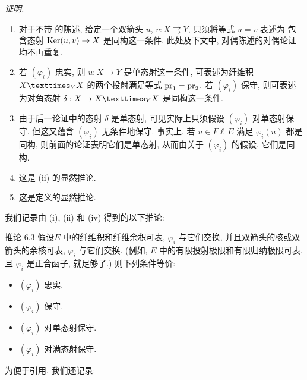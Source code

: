\noindent \emph{证明.}
\begin{enumerate}
\renewcommand{\theenumi}{\roman{enumi}}
\renewcommand{\labelenumi}{(\theenumi)}
\item 对于不带 \resp 的陈述, 给定一个双箭头
$u$, $v:X\rightrightarrows Y$, 只须将等式 $u=v$ 表述为
包含态射 $\operatorname{Ker}(u,v)\rightarrow X$ 是同构这一条件.
此处及下文中, 对偶陈述的对偶论证均不再重复.

\item 若 $(\varphi_i)$ 忠实, 则 $u:X\rightarrow Y$ 是单态射这一条件,
可表述为纤维积 $\fprod{X}{X}{Y}$ 的两个投射满足等式 $\operatorname{pr}_1=\operatorname{pr}_2$.
若 $(\varphi_i)$ 保守, 则可表述为对角态射
$\delta:X\rightarrow \fprod{X}{X}{Y}$ 是同构这一条件.

\setcounter{enumi}{3}
\item 由于后一论证中的态射 $\delta$ 是单态射,
可见实际上只须假设 $(\varphi_i)$ 对单态射保守.
但这又蕴含 $(\varphi_i)$ 无条件地保守.
事实上, 若 $u\in F\ell\,E$ 满足 $\varphi_i(u)$ 都是同构,
则前面的论证表明它们是单态射, 从而由关于 $(\varphi_i)$ 的假设,
它们是同构.

\setcounter{enumi}{2}
\item 这是 (ii) 的显然推论.

\setcounter{enumi}{4}
\item 这是定义的显然推论.
\end{enumerate}

我们记录由 (i), (ii) 和 (iv) 得到的以下推论:

\begin{enonce*}{推论 6.3}
假设\pageoriginale $E$ 中的纤维积和纤维余积可表,
$\varphi_i$ 与它们交换, 并且双箭头的核或双箭头的余核可表,
$\varphi_i$ 与它们交换.
(例如, $E$ 中的有限投射极限和有限归纳极限可表,
且 $\varphi_i$ 是正合函子, 就足够了.) 则下列条件等价:
\begin{itemize}
\item[a)] $(\varphi_i)$ 忠实.

\item[b)] $(\varphi_i)$ 保守.

\item[c)] $(\varphi_i)$ 对单态射保守.

\item[${\rm c')}$] $(\varphi_i)$ 对满态射保守.
\end{itemize}
\end{enonce*}
为便于引用, 我们还记录:

